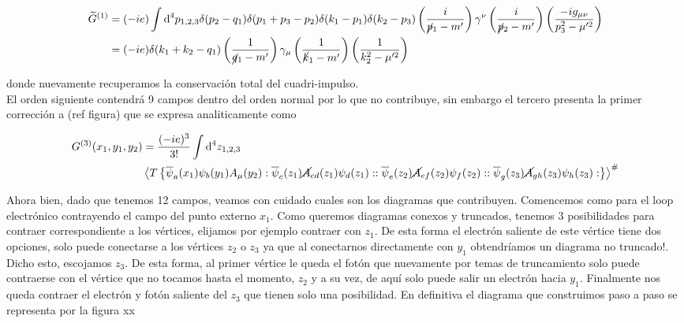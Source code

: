 \documentclass{article}
\numberwithin{equation}{section}
\begin{document}
\begin{equation}\label{key}
\begin{aligned}
\widetilde{G}^{(1)}&= (-ie)\int \mathrm{d^4}p_{1,2,3} \delta(p_2-q_1)\delta(p_1+p_3-p_2) \delta(k_1-p_1)\delta(k_2-p_3) \left(\frac{i}{\cancel{p}_1 -m'}\right) \gamma^{\nu}\left(\frac{i}{\cancel{p}_2 -m'}\right) \left(\frac{-ig_{\mu\nu}}{p^2_3-\mu'^2}\right)\\
&=(-ie) \delta(k_1 +k_2 -q_1)  \left(\frac{1}{\cancel{q}_1 -m'}\right) \gamma_{\mu}\left(\frac{1}{\cancel{k}_1 -m'}\right) \left(\frac{1}{k_2^2-\mu'^2}\right)
\end{aligned}
\end{equation}

donde nuevamente recuperamos la conservación total del cuadri-impulso.\\

El orden siguiente contendrá 9 campos dentro del orden normal por lo que no contribuye, sin embargo el tercero presenta la primer corrección a (ref figura) que se expresa analiticamente como

\begin{equation}\label{key}
\begin{aligned}
G^{(3)}(x_1,y_1,y_2)&=\frac{(-ie)^3}{3!}\int \mathrm{d^4}z_{1,2,3}\\
&\left\langle T\left\{ \overline{\psi}_a(x_1)\psi_b(y_1)A_{\mu}(y_2) :\overline{\psi}_c(z_{1})\cancel{A}_{cd}(z_{1})\psi_d(z_{1})::\overline{\psi}_e(z_2)\cancel{A}_{ef}(z_2)\psi_f(z_2)::\overline{\psi}_g(z_3)\cancel{A}_{gh}(z_3)\psi_h(z_3):\right\} \right\rangle ^{\#}
\end{aligned}
\end{equation}

Ahora bien, dado que tenemos 12 campos, veamos con cuidado cuales son los diagramas que contribuyen. Comencemos como para el loop electrónico contrayendo el campo del punto externo $ x_1 $. Como queremos diagramas conexos y truncados, tenemos 3 posibilidades para contraer correspondiente a los vértices, elijamos por ejemplo contraer con $ z_1 $. De esta forma el electrón saliente de este vértice tiene dos opciones, solo puede conectarse a los vértices $ z_2 $ o $ z_3 $ ya que al conectarnos directamente con $ y_1 $ obtendríamos un diagrama no truncado!. Dicho esto, escojamos $ z_3 $. De esta forma, al primer vértice le queda el fotón que nuevamente por temas de truncamiento solo puede contraerse con el vértice que no tocamos hasta el momento, $ z_2 $ y a su vez, de aquí solo puede salir un electrón hacia $ y_1 $. Finalmente nos queda contraer el electrón y fotón saliente del $ z_3 $ que tienen solo una posibilidad. En definitiva el diagrama que construimos paso a paso se representa por la figura xx\\
\end{document}
